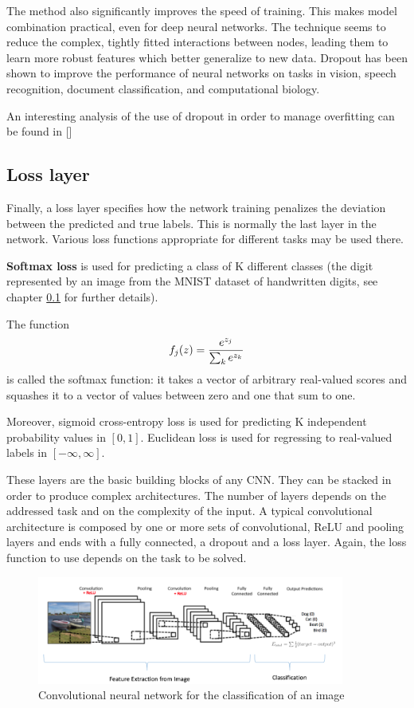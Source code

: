 The method also significantly improves the speed of training. This makes model combination practical, even for deep neural networks. The technique seems to reduce the complex, tightly fitted interactions between nodes, leading them to learn more robust features which better generalize to new data. Dropout has been shown to improve the performance of neural networks on tasks in vision, speech recognition, document classification, and computational biology.

An interesting analysis of the use of dropout in order to manage overfitting can be found in [\cite{Srivastava:2014:DSW:2627435.2670313}]

\subsection{Loss layer}

Finally, a loss layer specifies how the network training penalizes the deviation between the predicted and true labels. This is normally the last layer in the network. Various loss functions appropriate for different tasks may be used there. 

\textbf{Softmax loss} is used for predicting a class of K different classes (\ie the digit represented by an image from the MNIST dataset of handwritten digits, see chapter \ref{} for further details).

The function
\begin{equation} \notag
	f_j(z)=\frac{e^{z_j}}{\sum_{k}e^{z_k}}
\end{equation}
is called the softmax function: it takes a vector of arbitrary real-valued scores and squashes it to a vector of values between zero and one that sum to one.

Moreover, sigmoid cross-entropy loss is used for predicting K independent probability values in $[0,1]$. Euclidean loss is used for regressing to real-valued labels in $[-\infty ,\infty ]$.

\bigskip

These layers are the basic building blocks of any \acs{CNN}. They can be stacked in order to produce complex architectures. The number of layers depends on the addressed task and on the complexity of the input. A typical convolutional architecture is composed by one or more sets of convolutional, \acs{ReLU} and pooling layers and ends with a fully connected, a dropout and a loss layer. Again, the loss function to use depends on the task to be solved.

\begin{figure}
	\centering
	\includegraphics[width=0.9\textwidth]{Images/conv_architecture}
	\caption{Convolutional neural network for the classification of an image}\label{fig:conv_architecture}
\end{figure}

